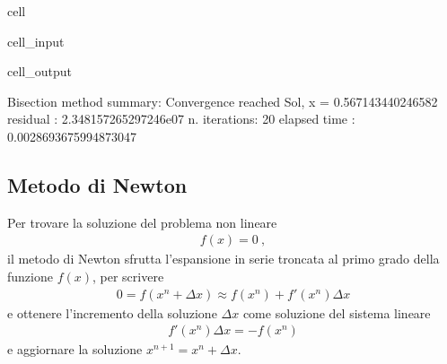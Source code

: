 \documentclass[letterpaper,10pt,italian]{jupyterBook}
\begin{document}
\begin{sphinxuseclass}{cell}
\begin{sphinxVerbatimInput}
\begin{sphinxuseclass}{cell_input}
\end{sphinxuseclass}\end{sphinxVerbatimInput}
\begin{sphinxVerbatimOutput}

\begin{sphinxuseclass}{cell_output}
\begin{sphinxVerbatim}[commandchars=\\\{\}]
Bisection method summary: 
Convergence reached
Sol, x = \PYGZhy{}0.567143440246582
residual     : \PYGZhy{}2.348157265297246e\PYGZhy{}07
n. iterations: 20
elapsed time : 0.0028693675994873047
\end{sphinxVerbatim}

\end{sphinxuseclass}\end{sphinxVerbatimOutput}

\end{sphinxuseclass}

\subsection{Metodo di Newton}
\label{\detokenize{ch/numerics/nonlinear:metodo-di-newton}}
\sphinxAtStartPar
Per trovare la soluzione del problema non lineare
\begin{equation*}
\begin{split}f(x) = 0 \ ,\end{split}
\end{equation*}
\sphinxAtStartPar
il metodo di Newton sfrutta l’espansione in serie troncata al primo grado della funzione \(f(x)\), per scrivere
\begin{equation*}
\begin{split}0 = f(x^n + \Delta x) \approx f(x^n) + f'(x^n) \Delta x \end{split}
\end{equation*}
\sphinxAtStartPar
e ottenere l’incremento della soluzione \(\Delta x\) come soluzione del sistema lineare
\begin{equation*}
\begin{split}f'(x^n) \Delta x = -f(x^n)\end{split}
\end{equation*}
\sphinxAtStartPar
e aggiornare la soluzione \(x^{n+1} = x^{n} + \Delta x\).
\end{document}
